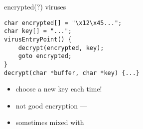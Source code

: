 
\begin{frame}[fragile,label=encrypted]{encrypted(?) viruses}
\lstset{language=C,style=small}
\begin{lstlisting}
char encrypted[] = "\x12\x45...";
char key[] = "...";
virusEntryPoint() {
    decrypt(encrypted, key);
    goto encrypted;
}
decrypt(char *buffer, char *key) {...}
\end{lstlisting}
\begin{itemize}
    \item choose a new key each time!
    \item not good encryption --- 
    \item sometimes mixed with 
\end{itemize}
\end{frame}

